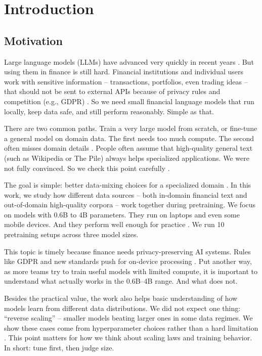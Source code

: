 \chapter{Introduction}

\section{Motivation}

Large language models (LLMs) have advanced very quickly in recent years \parencite{vaswani2017attention,radford2019language,brown2020language,touvron2023llama}. But using them in finance is still hard. Financial institutions and individual users work with sensitive information -- transactions, portfolios, even trading ideas -- that should not be sent to external APIs because of privacy rules and competition (e.g., GDPR) \parencite{eu2016gdpr}. So we need small financial language models that run locally, keep data safe, and still perform reasonably. Simple as that.

There are two common paths. Train a very large model from scratch, or fine-tune a general model on domain data. The first needs too much compute. The second often misses domain details \parencite{gururangan2020don}. People often assume that high-quality general text (such as Wikipedia or The Pile) always helps specialized applications. We were not fully convinced. So we check this point carefully \parencite{gao2020pile,raffel2020exploring,longpre2023pretrainer}.

The goal is simple: better data-mixing choices for a specialized domain \parencite{wu2023bloomberggpt}. In this work, we study how different data sources -- both in-domain financial text and out-of-domain high-quality corpora -- work together during pretraining. We focus on models with 0.6B to 4B parameters. They run on laptops and even some mobile devices. And they perform well enough for practice \parencite{yang2024qwen2,xia2023sheared,team2024gemma,javaheripi2023phi}. We run 10 pretraining setups across three model sizes.

This topic is timely because finance needs privacy-preserving AI systems. Rules like GDPR and new standards push for on-device processing \parencite{eu2016gdpr}. Put another way, as more teams try to train useful models with limited compute, it is important to understand what actually works in the 0.6B--4B range. And what does not.

Besides the practical value, the work also helps basic understanding of how models learn from different data distributions. We did not expect one thing: ``reverse scaling'' -- smaller models beating larger ones in some data regimes. We show these cases come from hyperparameter choices rather than a hard limitation \parencite{kaplan2020scaling,hoffmann2022training,mccandlish2018empirical}. This point matters for how we think about scaling laws and training behavior. In short: tune first, then judge size.

